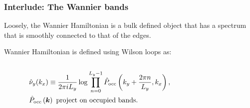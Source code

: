 \documentclass{beamer}
\renewcommand{\(}{\left(}
\renewcommand{\)}{\right)}
\renewcommand{\[}{\left[}
\renewcommand{\]}{\right]}
\begin{document}
\begin{frame}
    \frametitle{Interlude: The Wannier bands}
    Loosely, the Wannier Hamiltonian is a bulk defined object that has a spectrum that is smoothly connected to that of the edges. \pause
    
    Wannier Hamiltonian is defined using Wilson loops as: 
    \begin{columns}
        \begin{column}{0.8\textwidth}
            \begin{align*}
                &\hat\nu_y(k_x) \equiv \frac{1}{2\pi i L_y}\log\prod_{n=0}^{L_y-1} \hat P_{\rm occ}\(k_y+\frac{2\pi n}{L_y}, k_x\), \nonumber \\ 
                &\hat P_{\rm occ}\(\bm k\) \ \text{project on occupied bands.}
            \end{align*}
        \end{column}
        \begin{column}{0.2\textwidth}
        \end{column}
    \end{columns}\pause
    \begin{figure}[]
        \centering

\end{figure}
\end{frame}
\end{document}
